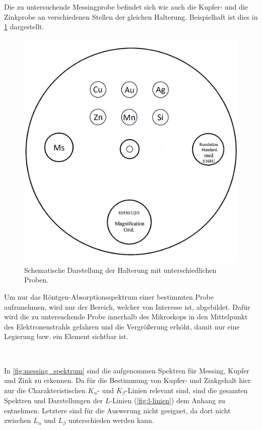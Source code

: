 	Die zu untersuchende Messingprobe befindet sich wie auch die Kupfer- und die Zinkprobe an verschiedenen Stellen der gleichen Halterung.
	Beispielhaft ist dies in \cref{fig:messing_halterung} dargestellt.
	\begin{figure}
		\centering
		\includegraphics[width=.4\textwidth]{img/Messingprobe}
		\caption{Schematische Darstellung der Halterung mit unterschiedlichen Proben.\cite{wwu}}
		\label{fig:messing_halterung}
	\end{figure}
	Um nur das Röntgen-Absorptionsspektrum einer bestimmten Probe aufzunehmen, wird nur der Bereich, welcher von Interesse ist, abgebildet.
	Dafür wird die zu untersuchende Probe innerhalb des Mikroskops in den Mittelpunkt des Elektronenstrahls gefahren und die Vergrößerung erhöht, damit nur eine Legierung bzw. ein Element sichtbar ist.

	\

	In \cref{fig:messing_spektrum} sind die aufgenommen Spektren für Messing, Kupfer und Zink zu erkennen.
	Da für die Bestimmung von Kupfer- und Zinkgehalt hier nur die Charakteristischen $K_\alpha$- und $K_\beta$-Linien relevant sind, sind die gesamten Spektren und Darstellungen der $L$-Linien (\cref{fig:l-linien}) dem Anhang zu entnehmen.
	Letztere sind für die Auswerung nicht geeignet, da dort nicht zwischen $L_\alpha$ und $L_\beta$ unterschieden werden kann.


